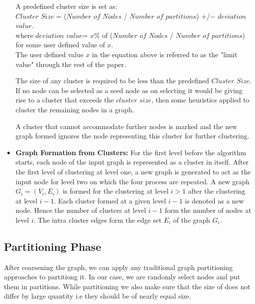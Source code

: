 \documentclass[letterpaper]{article}
\begin{document}
\begin{itemize}
\begin{itemize}
\end{itemize} %

A predefined cluster size is set as:\\

$Cluster$ $Size$ = ($Number$ $of$ $Nodes$ / $Number$ $of$ $partitions$) $+$/$-$
$deviation$ $value$.\\

where $deviation$ $value$= $x\%$ of ($Number$ $of$ $Nodes$ / $Number$ $of$
$partitions$) for some user defined value of $x$.\\ 


The user defined value $x$ in the equation above is referred to as the "limit
value" through the rest of the paper.

The size of any cluster is required to be less than the predefined $Cluster$
$Size$. If no node can be selected as a seed node as on selecting it would be
giving rise to a cluster that exceeds the $cluster$ $size$, then some
heuristics applied to cluster the remaining nodes in a graph.  

A cluster that cannot accommodate further nodes is marked and the new graph
formed ignores the node representing this cluster for further clustering. 



\item \textbf{Graph Formation from Clusters:} For the first level before the
algorithm starts, each node of the input graph is represented as a cluster in
itself. After the first level of clustering at level one, a new graph is
generated to act as the input node for level two on which the four process are
repeated. A new graph $G_i=(V_i, E_i)$ is formed for the clustering at level $i
> 1$ after the clustering at level $i-1$. Each cluster formed at a given level
$i-1$ is denoted as a new node. Hence the number of clusters at level $i-1$
form the number of nodes at level $i$. The intra cluster edges form the edge
set $E_i$ of the graph $G_i$.




\end{itemize} %

\subsection{Partitioning Phase}
After coarsening the graph, we can apply any traditional graph partitioning
approaches to partitiong it. In our case, we are randomly select nodes and put
them in partitions. While partitioning we also make sure that the size of does
not differ by large quantity i.e they should be of nearly equal size.
\end{document}

